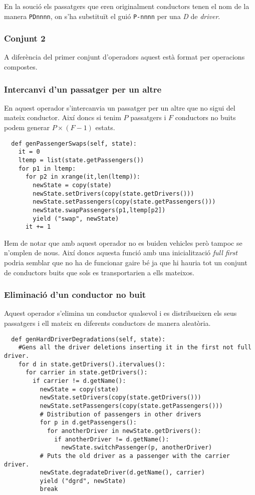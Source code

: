 En la so\lgem ució els passatgers que eren originalment conductors tenen el nom de la manera \texttt{PDnnnn},
on s'ha substituït el guió \texttt{P-nnnn} per una \emph{D} de \emph{driver}.

\subsubsection{Conjunt 2}
A diferència del primer conjunt d'operadors aquest està format per operacions compostes.

\subsubsection{Intercanvi d'un passatger per un altre}
En aquest operador s'intercanvia un passatger per un altre que no sigui del mateix conductor.
Així doncs si tenim $P$ passatgers i $F$ conductors no buits podem generar $P \times (F-1)$ estats. 

\begin{verbatim}
  def genPassengerSwaps(self, state):
    it = 0
    ltemp = list(state.getPassengers())
    for p1 in ltemp:
      for p2 in xrange(it,len(ltemp)):
        newState = copy(state)
        newState.setDrivers(copy(state.getDrivers()))
        newState.setPassengers(copy(state.getPassengers()))
        newState.swapPassengers(p1,ltemp[p2])
        yield ("swap", newState)
      it += 1
\end{verbatim}

Hem de notar que amb aquest operador no es buiden vehicles però tampoc se n'omplen de nous.
Així doncs aquesta funció amb una inicialització \emph{full first} podria semblar que no ha de funcionar
gaire bé ja que hi hauria tot un conjunt de conductors buits que sols es transportarien a ells mateixos.


\subsubsection{Eliminació d'un conductor no buit}
Aquest operador s'elimina un conductor qualsevol i es distribueixen els seus passatgers i ell mateix
en diferents conductors de manera aleatòria.

\begin{verbatim}
  def genHardDriverDegradations(self, state):
    #Gens all the driver deletions inserting it in the first not full driver.
    for d in state.getDrivers().itervalues():
      for carrier in state.getDrivers():
        if carrier != d.getName():
          newState = copy(state)
          newState.setDrivers(copy(state.getDrivers()))
          newState.setPassengers(copy(state.getPassengers()))
          # Distribution of passengers in other drivers
          for p in d.getPassengers():
            for anotherDriver in newState.getDrivers():
              if anotherDriver != d.getName():
                newState.switchPassenger(p, anotherDriver)
          # Puts the old driver as a passenger with the carrier driver.
          newState.degradateDriver(d.getName(), carrier)
          yield ("dgrd", newState)
          break
\end{verbatim}

